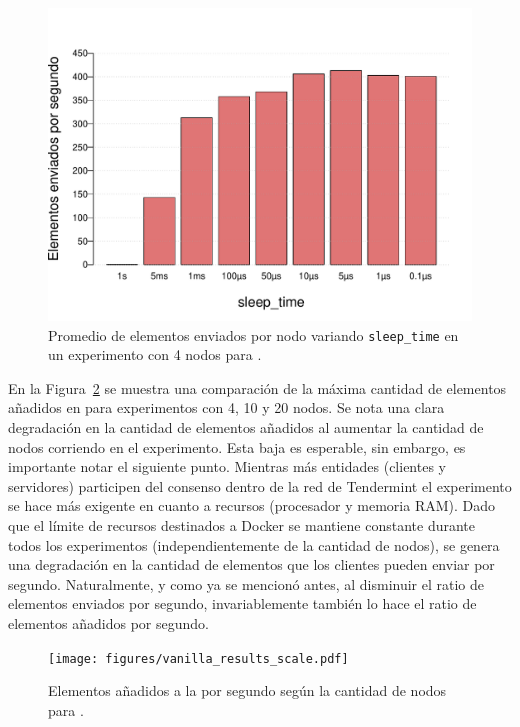 \begin{figure}
	\centering
	\includegraphics[scale=0.5]{figures/sleep_time_2.pdf}
	\caption{Promedio de elementos enviados por nodo variando \texttt{sleep\_time} en un experimento con 4 nodos para \vanilla.}
	\label{fig:elements_against_sleep_time}
\end{figure}

En la Figura~\ref{fig:vanilla_results} se muestra una comparación de la máxima cantidad de elementos añadidos en \vanilla para experimentos con
4, 10 y 20 nodos.
%
Se nota una clara degradación en la cantidad de elementos añadidos al aumentar la cantidad de nodos corriendo en el experimento.
Esta baja es esperable, sin embargo, es importante notar el siguiente punto.
Mientras más entidades (clientes y servidores) participen del consenso dentro de la red de Tendermint el experimento se hace más exigente en cuanto a recursos
(procesador y memoria RAM).
Dado que el límite de recursos destinados a Docker se mantiene constante durante todos los experimentos (independientemente de la cantidad de nodos),
se genera una degradación en la cantidad de elementos que los clientes pueden enviar por segundo.
Naturalmente, y como ya se mencionó antes, al disminuir el ratio de elementos enviados por segundo, invariablemente también lo hace el ratio de
elementos añadidos por segundo.

\begin{figure}
	\centering
	\texttt{[image: figures/vanilla\_results\_scale.pdf]}
	\caption{Elementos añadidos a la \setchain por segundo según la cantidad de nodos para \vanilla.}
	\label{fig:vanilla_results}
\end{figure}

